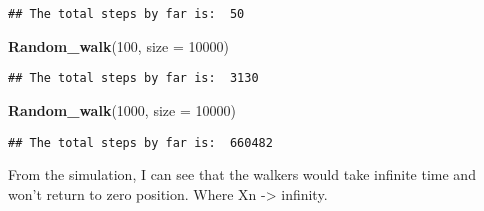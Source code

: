 \documentclass[]{article}
\newenvironment{Shaded}{\begin{snugshade}}{\end{snugshade}}
\newcommand{\DataTypeTok}[1]{\textcolor[rgb]{0.13,0.29,0.53}{#1}}
\newcommand{\DecValTok}[1]{\textcolor[rgb]{0.00,0.00,0.81}{#1}}
\newcommand{\KeywordTok}[1]{\textcolor[rgb]{0.13,0.29,0.53}{\textbf{#1}}}
\newcommand{\NormalTok}[1]{#1}
\begin{document}
\begin{verbatim}
## The total steps by far is:  50
\end{verbatim}

\begin{Shaded}
\begin{Highlighting}[]
\KeywordTok{Random_walk}\NormalTok{(}\DecValTok{100}\NormalTok{, }\DataTypeTok{size =} \DecValTok{10000}\NormalTok{)}
\end{Highlighting}
\end{Shaded}

\begin{verbatim}
## The total steps by far is:  3130
\end{verbatim}

\begin{Shaded}
\begin{Highlighting}[]
\KeywordTok{Random_walk}\NormalTok{(}\DecValTok{1000}\NormalTok{, }\DataTypeTok{size =} \DecValTok{10000}\NormalTok{)}
\end{Highlighting}
\end{Shaded}

\begin{verbatim}
## The total steps by far is:  660482
\end{verbatim}

From the simulation, I can see that the walkers would take infinite time
and won't return to zero position. Where Xn -\textgreater{} infinity.
\end{document}
